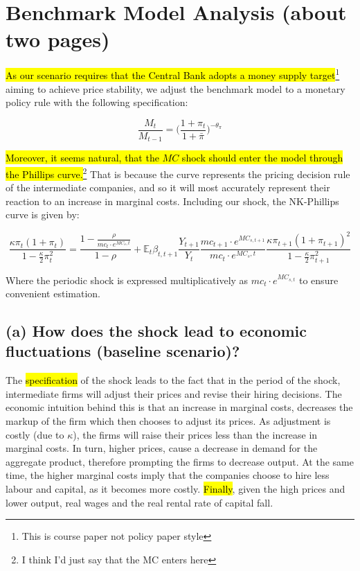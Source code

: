 \documentclass[12pt]{article}
\begin{document}
\newpage
\section{Benchmark Model Analysis (about two pages)}

\hl{As our scenario requires that the Central Bank adopts a money supply target}\footnote{This is course paper not policy paper style} aiming to achieve price stability, we adjust the benchmark model to a monetary policy rule with the following specification:


\begin{equation}\label{eq:baseline_rule}
    \frac{M_t}{M_{t-1}} = \Big(\frac{1+\pi_{t}}{1+ \bar \pi}\Big)^{-\theta_{\pi}}
\end{equation}

\hl{Moreover, it seems  natural, that the $MC$ shock should enter the model through the Phillips curve.}\footnote{I think I'd just say that the MC enters here} That is because the curve represents the pricing decision rule of the intermediate companies, and so it will most accurately represent their reaction to an increase in marginal costs. Including our shock, the NK-Phillips curve is given by: 

\begin{equation}
    \frac{\kappa \pi_t (1 + \pi_t)}{1 - \frac{\kappa}{2} \pi_t^2}
    = \frac{1 - \frac{\rho}{mc_t \cdot e^{MC_s,t}}}{1 - \rho}
    + \mathbb{E}_t \beta_{t,t+1}
    \frac{Y_{t+1}}{Y_t}
    \frac{mc_{t+1} \cdot e^{MC_{s,t+1}}}{mc_t \cdot e^{MC_s,t}}
    \frac{\kappa \pi_{t+1} (1 + \pi_{t+1})^{2}}{1 - \frac{\kappa}{2} \pi_{t+1}^2}
\end{equation}

Where the periodic shock is expressed multiplicatively as $mc_t \cdot e^{MC_{s, t}}$ to ensure convenient estimation.

\subsection*{(a) How does the shock lead to economic fluctuations (baseline scenario)?}

The \hl{specification} of the shock leads to the fact that in the period of the shock, intermediate firms will adjust their prices and revise their hiring decisions. The economic intuition behind this is that an increase in marginal costs, decreases the markup of the firm which then chooses to adjust its prices. As adjustment is costly (due to $\kappa$), the firms will raise their prices less than the increase in marginal costs. In turn, higher prices, cause a decrease in demand for the aggregate product, therefore prompting the firms to decrease output. At the same time, the higher marginal costs imply that the companies choose to hire less labour and capital, as it becomes more costly. \hl{Finally}, given the high prices and lower output, real wages and the real rental rate of capital fall.
\end{document}
